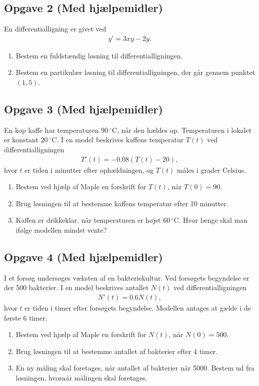 \subsection*{Opgave 2 (Med hjælpemidler)}
En differentialligning er givet ved
\begin{align*}
	y' = 3xy - 2y.
\end{align*}
\begin{enumerate}[label=\roman*)]
	\item Bestem en fuldstændig løsning til differentialligningen.
	\item Bestem en partikulær løsning til differentialligningen, der går gennem punktet $(1, 5)$.
\end{enumerate}



\subsection*{Opgave 3 (Med hjælpemidler)}
En kop kaffe har temperaturen $90\ ^{\circ}$C, når den hældes op. Temperaturen i lokalet er konstant $20\ ^{\circ}$C. I en model beskrives kaffens temperatur $T(t)$ ved differentialligningen
\begin{align*}
	T'(t) = -0.08\left(T(t)-20\right),
\end{align*}
hvor $t$ er tiden i minutter efter ophældningen, og $T(t)$ måles i grader Celsius.
\begin{enumerate}[label=\roman*)]
	\item Bestem ved hjælp af Maple en forskrift for $T(t)$, når $T(0)=90$.
	\item Brug løsningen til at bestemme kaffens temperatur efter 10 minutter.
	\item Kaffen er drikkeklar, når temperaturen er højst $60\,^{\circ}\mathrm{C}$. Hvor længe skal man ifølge modellen mindst vente?
\end{enumerate}

\subsection*{Opgave 4 (Med hjælpemidler)}
I et forsøg undersøges væksten af en bakteriekultur. Ved forsøgets begyndelse er der 500 bakterier. I en model beskrives antallet $N(t)$ ved differentialligningen
\begin{align*}
	N'(t) = 0.6N(t),
\end{align*}
hvor $t$ er tiden i timer efter forsøgets begyndelse. Modellen antages at gælde i de første 6 timer.
\begin{enumerate}[label=\roman*)]
	\item Bestem ved hjælp af Maple en forskrift for $N(t)$, når $N(0)=500$.
	\item Brug løsningen til at bestemme antallet af bakterier efter 4 timer.
	\item En ny måling skal foretages, når antallet af bakterier når 5000. Bestem ud fra løsningen, hvornår målingen skal foretages.
\end{enumerate}

